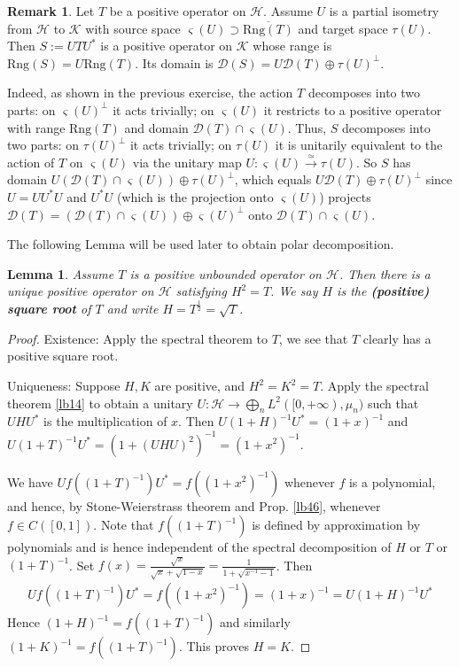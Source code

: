 \documentclass[12pt,a4paper,notitlepage]{article}
\theoremstyle{definition}
\newtheorem{rem}[df]{Remark}
\theoremstyle{plain}
\newtheorem{lm}[df]{Lemma}
\newcommand{\mc}{\mathcal}
\newcommand{\ovl}{\overline}
\newcommand{\Dom}{\scr D}
\newcommand{\scr}{\mathscr}
\newcommand{\sgm}{\varsigma}
\newcommand{\Rng}{\mathrm{Rng}}
\numberwithin{equation}{section}
\begin{document}
\begin{rem}\label{lb21}
Let $T$ be a positive operator on $\mc H$. Assume $U$ is a partial isometry from $\mc H$ to $\mc K$ with source space $\sgm(U)\supset\ovl{\Rng(T)}$ and target space $\tau(U)$. Then $S:=UTU^*$ is a positive operator on $\mc K$ whose range is $\Rng(S)=U\Rng(T)$. Its domain is $\Dom(S)=U\Dom(T)\oplus \tau(U)^\perp$. 

Indeed, as shown in the previous exercise, the action $T$ decomposes into two parts: on $\sgm(U)^\perp$ it acts trivially; on $\sgm(U)$ it restricts to a positive operator with range $\Rng(T)$ and domain $\Dom(T)\cap\sgm(U)$. Thus, $S$ decomposes into two parts: on $\tau(U)^\perp$ it acts trivially; on $\tau(U)$ it is unitarily equivalent to the action of $T$ on $\sgm(U)$ via the unitary map $U:\sgm(U)\xrightarrow{\simeq}\tau(U)$. So $S$ has domain $U(\Dom(T)\cap \sgm(U))\oplus \tau(U)^\perp$, which equals $U\Dom(T)\oplus \tau(U)^\perp$ since $U=UU^*U$ and $U^*U$ (which is the projection onto $\sgm(U)$) projects $\Dom(T)=(\Dom(T)\cap\sgm(U))\oplus \sgm(U)^\perp$ onto $\Dom(T)\cap\sgm(U)$.
\end{rem}







The following Lemma will be used later to obtain polar decomposition.

\begin{lm}\label{lb19}
Assume $T$ is a positive unbounded operator on $\mc H$. Then there is a unique positive operator on $\mc H$ satisfying $H^2=T$. We say $H$ is the \textbf{(positive) square root} of $T$ and write $H=T^{\frac 12}=\sqrt T$. 
\end{lm}

\begin{proof}
Existence: Apply the spectral theorem to $T$, we see that $T$ clearly has a positive square root.
	
Uniqueness: Suppose $H,K$ are positive, and $H^2=K^2=T$. Apply the spectral theorem \ref{lb14} to obtain a unitary $U:\mc H\rightarrow\bigoplus_n L^2([0,+\infty),\mu_n)$ such that $UHU^*$ is the multiplication of $x$. Then $U(1+H)^{-1}U^*=(1+x)^{-1}$ and $U(1+T)^{-1}U^*=(1+(UHU)^2)^{-1}=(1+x^2)^{-1}$.

We have $Uf((1+T)^{-1})U^*=f((1+x^2)^{-1})$ whenever $f$ is a polynomial, and hence, by Stone-Weierstrass theorem and Prop. \ref{lb46}, whenever $f\in C([0,1])$.  Note that $f((1+T)^{-1})$ is defined by approximation by polynomials and is hence independent of the spectral decomposition of $H$ or $T$ or $(1+T)^{-1}$. Set $f(x)=\frac{\sqrt x}{\sqrt x+\sqrt{1-x}}=\frac{1}{1+\sqrt{x^{-1}-1}}$. Then
\begin{align*}
Uf((1+T)^{-1})U^*=f((1+x^2)^{-1})=(1+x)^{-1}=U(1+H)^{-1}U^*
\end{align*}
Hence $(1+H)^{-1}=f((1+T)^{-1})$ and similarly $(1+K)^{-1}=f((1+T)^{-1})$. This proves $H=K$.
\end{proof}
\end{document}
